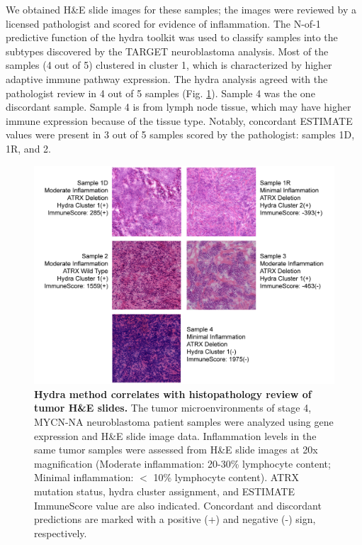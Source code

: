 \documentclass[10pt,letterpaper]{article}
\begin{document}
We obtained H\&E slide images for these samples; the images were reviewed by a licensed pathologist and scored for evidence of inflammation. The N-of-1 predictive function of the hydra toolkit was used to classify samples into the subtypes discovered by the TARGET neuroblastoma analysis. Most of the samples (4 out of 5) clustered in cluster 1, which is characterized by higher adaptive immune pathway expression. The hydra analysis agreed with the pathologist review in 4 out of 5 samples (Fig. \ref{hefig}). Sample 4 was the one discordant sample. Sample 4 is from lymph node tissue, which may have higher immune expression because of the tissue type. Notably, concordant ESTIMATE values were present in 3 out of 5 samples scored by the pathologist: samples 1D, 1R, and 2. 

\begin{figure}[!h]
	\includegraphics[width=\textwidth]{img/NBL-MYCN-NA-HE-2x}
	\caption{{\bf Hydra method correlates with histopathology review of tumor H\&E slides.}
		The tumor microenvironments of stage 4, MYCN-NA neuroblastoma patient samples were analyzed using gene expression and H\&E slide image data. Inflammation levels in the same tumor samples were assessed from H\&E slide images at 20x magnification (Moderate inflammation: 20-30\% lymphocyte content; Minimal inflammation: $<$ 10\% lymphocyte content). ATRX mutation status, hydra cluster assignment, and ESTIMATE ImmuneScore value are also indicated. Concordant and discordant predictions are marked with a positive (+) and negative (-) sign, respectively.}
	\label{hefig}
\end{figure}
\end{document}

